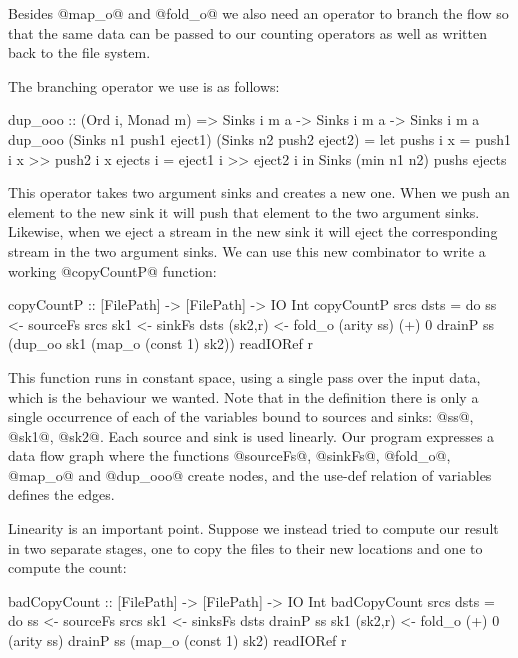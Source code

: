 \vspace{-0.5ex}
Besides @map_o@ and @fold_o@ we also need an operator to branch the flow so that the same data can be passed to our counting operators as well as written back to the file system. 

The branching operator we use is as follows:

\begin{code}
dup_ooo :: (Ord i, Monad m)
       => Sinks i m a -> Sinks i m a -> Sinks i m a
dup_ooo (Sinks n1 push1 eject1) 
        (Sinks n2 push2 eject2)
 = let pushs  i x = push1 i x >> push2 i x
       ejects i   = eject1 i  >> eject2 i
   in  Sinks (min n1 n2) pushs ejects
\end{code}

This operator takes two argument sinks and creates a new one. When we push an element to the new sink it will push that element to the two argument sinks. Likewise, when we eject a stream in the new sink it will eject the corresponding stream in the two argument sinks. We can use this new combinator to write a working @copyCountP@ function:

\begin{code}
copyCountP :: [FilePath] -> [FilePath] -> IO Int
copyCountP srcs dsts
 = do  ss      <- sourceFs srcs
       sk1     <- sinkFs   dsts
       (sk2,r) <- fold_o  (arity ss) (+) 0 
       drainP ss (dup_oo sk1 (map_o (const 1) sk2))
       readIORef r
\end{code}

This function runs in constant space, using a single pass over the input data, which is the behaviour we wanted. Note that in the definition there is only a single occurrence of each of the variables bound to sources and sinks: @ss@, @sk1@, @sk2@. Each source and sink is used linearly. Our program expresses a data flow graph where the functions @sourceFs@, @sinkFs@, @fold_o@, @map_o@ and @dup_ooo@ create nodes, and the use-def relation of variables defines the edges.

Linearity is an important point. Suppose we instead tried to compute our result in two separate stages, one to copy the files to their new locations and one to compute the count:
\begin{code}
badCopyCount :: [FilePath] -> [FilePath] -> IO Int
badCopyCount srcs dsts
 = do  ss      <- sourceFs srcs
       sk1     <- sinksFs  dsts
       drainP ss sk1
       (sk2,r) <- fold_o (+) 0 (arity ss)
       drainP ss (map_o (const 1) sk2)
       readIORef r
\end{code}

